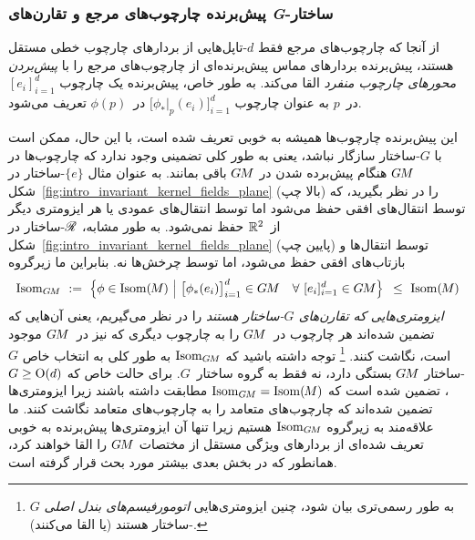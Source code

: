\subsubsection{پیش‌برنده چارچوب‌های مرجع و تقارن‌های \textit{G}-ساختار}

از آنجا که چارچوب‌های مرجع فقط $d$-تاپل‌هایی از بردارهای چارچوب خطی مستقل هستند، پیش‌برنده بردارهای مماس پیش‌برنده‌ای از چارچوب‌های مرجع را با \emph{پیش‌بردن محورهای چارچوب منفرد} القا می‌کند.
به طور خاص، پیش‌برنده یک چارچوب $[e_i]_{i=1}^d$ در~$p$ به عنوان چارچوب $\big[ \phi_*|_p (e_i) \big]_{i=1}^d$ در~$\phi(p)$ تعریف می‌شود.


این پیش‌برنده چارچوب‌ها همیشه به خوبی تعریف شده است، با این حال، ممکن است با $G$-ساختار سازگار نباشد، یعنی به طور کلی تضمینی وجود ندارد که چارچوب‌ها در $G\mkern-1.4muM$ هنگام پیش‌برده شدن در $G\mkern-1.4muM$ باقی بمانند.
به عنوان مثال $\{e\}$-ساختار در شکل~\ref{fig:intro_invariant_kernel_fields_plane} (بالا چپ) را در نظر بگیرید، که توسط انتقال‌های افقی حفظ می‌شود اما توسط انتقال‌های عمودی یا هر ایزومتری دیگر از~$\mathbb{R}^2$ حفظ نمی‌شود.
به طور مشابه، $\mathscr{R}$-ساختار در شکل~\ref{fig:intro_invariant_kernel_fields_plane} (پایین چپ) توسط انتقال‌ها و بازتاب‌های افقی حفظ می‌شود، اما توسط چرخش‌ها نه.
بنابراین ما زیرگروه
\begin{align}\label{eq:IsomGM_def_24}
	\IsomGM\ :=\ \pig\{ \phi \in \IsomM \ \pig|\ 
	\big[\phi_*(e_i)\big]_{i=1}^d \in \GM \quad \forall\ [e_i]_{i=1}^d \in \GM \pig\} \,\ \leq\ \IsomM
\end{align}
\emph{ایزومتری‌هایی که تقارن‌های $G$-ساختار هستند} را در نظر می‌گیریم، یعنی آن‌هایی که تضمین شده‌اند هر چارچوب در~$G\mkern-1.4muM$ را به چارچوب دیگری که نیز در~$G\mkern-1.4muM$ موجود است، نگاشت کنند.%
\footnote{
	به طور رسمی‌تری بیان شود، چنین ایزومتری‌هایی \emph{اتومورفیسم‌های بندل اصلی} $G$-ساختار هستند (یا القا می‌کنند).
}
توجه داشته باشید که $\operatorname{Isom}_{G\mkern-1.4muM}$ به طور کلی به انتخاب خاص $G$-ساختار $G\mkern-1.4muM$ بستگی دارد، نه فقط به گروه ساختار~$G$.
برای حالت خاص که $G\geq\operatorname{O}(d)$، تضمین شده است که $\operatorname{Isom}_{G\mkern-1.4muM}=\operatorname{Isom}(\mkern-1.5mu M \mkern-.5mu)$ مطابقت داشته باشند زیرا ایزومتری‌ها تضمین شده‌اند که چارچوب‌های متعامد را به چارچوب‌های متعامد نگاشت کنند.
ما علاقه‌مند به زیرگروه $\operatorname{Isom}_{G\mkern-1.4muM}$ هستیم زیرا تنها آن ایزومتری‌ها پیش‌برنده به خوبی تعریف شده‌ای از بردارهای ویژگی مستقل از مختصات $G\mkern-1.4muM$ را القا خواهند کرد، همانطور که در بخش بعدی بیشتر مورد بحث قرار گرفته است.


